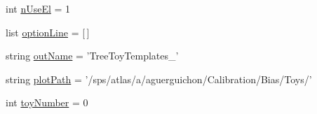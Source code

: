\begin{DoxyCompactItemize}
\item 
int \hyperlink{namespaceGenerateToyTemplates_a82b5d2cf7a53a81e6b18c90ad139db27}{n\+Use\+El} = 1
\item 
list \hyperlink{namespaceGenerateToyTemplates_a51b79a8a6aae1e130ae3e361104ea0d6}{option\+Line} = \mbox{[}$\,$\mbox{]}
\item 
string \hyperlink{namespaceGenerateToyTemplates_aaccf54db74807c13792acb7416cfbd6e}{out\+Name} = 'Tree\+Toy\+Templates\+\_\+'
\item 
string \hyperlink{namespaceGenerateToyTemplates_a8cec9a397ac7c43865816314f199498f}{plot\+Path} = '/sps/atlas/a/aguerguichon/Calibration/Bias/Toys/'
\item 
int \hyperlink{namespaceGenerateToyTemplates_a00b582b0661699c37ccaf4a1cf38ba8d}{toy\+Number} = 0
\end{DoxyCompactItemize}


